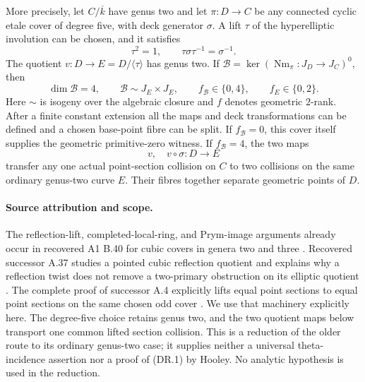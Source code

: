 \documentclass[11pt,a4paper]{article}
\begin{document}
More precisely, let $C/\overline k$ have genus two and let
$\pi:D\to C$ be any connected cyclic etale cover of degree five, with
deck generator $\sigma$.  A lift $\tau$ of the hyperelliptic involution
can be chosen, and it satisfies
\[
 \tau^2=1,\qquad \tau\sigma\tau^{-1}=\sigma^{-1}.
 \tag{DR.2}
\]
The quotient $v:D\to E=D/\langle\tau\rangle$ has genus two.  If
$\mathcal B=\ker(\operatorname{Nm}_\pi:J_D\to J_C)^0$, then
\[
 \dim\mathcal B=4,\qquad
 \mathcal B\sim J_E\times J_E,\qquad
 f_{\mathcal B}\in\{0,4\},\qquad f_E\in\{0,2\}.
 \tag{DR.3}
\]
Here $\sim$ is isogeny over the algebraic closure and $f$ denotes
geometric $2$-rank.  After a finite constant extension all the maps and
deck transformations can be defined and a chosen base-point fibre can
be split.  If $f_{\mathcal B}=0$, this cover itself supplies the
geometric primitive-zero witness.  If $f_{\mathcal B}=4$, the two maps
\[
                         v,\quad v\circ\sigma:D\longrightarrow E
 \tag{DR.4}
\]
transfer any one actual point-section collision on $C$ to two collisions
on the same ordinary genus-two curve $E$.  Their fibres together
separate geometric points of $D$.

\paragraph{Source attribution and scope.}
The reflection-lift, completed-local-ring, and Prym-image arguments
already occur in recovered A1 B.40 for cubic covers in genera two and
three \cite[B.40]{A1run}.  Recovered successor A.37 studies a pointed
cubic reflection quotient and explains why a reflection twist does not
remove a two-primary obstruction on its elliptic quotient
\cite[A.37]{ASrun}.  The complete proof of successor A.4 explicitly
lifts equal point sections to equal point sections on the same chosen
odd cover \cite[A.4]{ASrun}.  We use that machinery explicitly here.  The
degree-five choice retains genus two, and the two quotient maps below
transport one common lifted section collision.  This is a reduction of
the older route to its ordinary genus-two case; it supplies neither a
universal theta-incidence assertion nor a proof of (DR.1) by Hooley.
No analytic hypothesis is used in the reduction.
\end{document}
